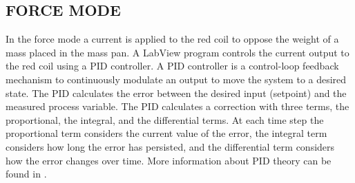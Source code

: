 \documentclass[aps,prstab,reprint,12pt]{revtex4-1}
\begin{document}



\subsection{FORCE MODE}

In the force mode a current is applied to the red coil to oppose the weight of a mass placed in the mass pan. A LabView program controls the current output to the red coil using a PID controller. A PID controller is a control-loop feedback mechanism to continuously modulate an output to move the system to a desired state.
The PID calculates the error between the desired input (setpoint) and the measured process variable.
The PID calculates a correction with three terms, the proportional, the integral, and the differential terms. At each time step the proportional term considers the current value of the error, the integral term considers how long the error has persisted, and the differential term considers how the error changes over time.
More information about PID theory can be found in \cite{pid}.
\end{document}
